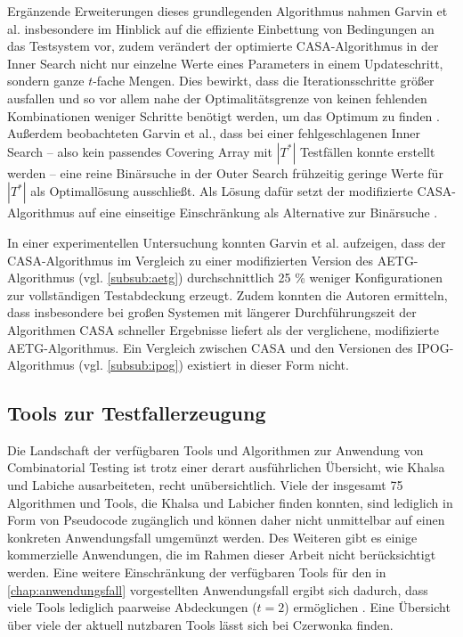 Ergänzende Erweiterungen dieses grundlegenden Algorithmus nahmen Garvin et al.\linebreak \cite{garvin2011evaluating} insbesondere im Hinblick auf die effiziente Einbettung von Bedingungen an das Testsystem vor, zudem verändert der optimierte CASA-Algorithmus in der \glqq Inner Search\grqq{} nicht nur einzelne Werte eines Parameters in einem Updateschritt, sondern ganze $t$-fache Mengen. Dies bewirkt, dass die Iterationsschritte größer ausfallen und so vor allem nahe der Optimalitätsgrenze von keinen fehlenden Kombinationen weniger Schritte benötigt werden, um das Optimum zu finden \cite{garvin2011evaluating}. Außerdem beobachteten Garvin et al., dass bei einer fehlgeschlagenen \glqq Inner Search\grqq{} -- also kein passendes Covering Array mit $|T^*|$ Testfällen konnte erstellt werden -- eine reine Binärsuche in der \glqq Outer Search\grqq{} frühzeitig geringe Werte für $|T^*|$ als Optimallösung ausschließt. Als Lösung dafür setzt der modifizierte CASA-Algorithmus auf eine einseitige Einschränkung als Alternative zur Binärsuche \cite{garvin2011evaluating}.

In einer experimentellen Untersuchung konnten Garvin et al. \cite{garvin2011evaluating} aufzeigen, dass der CASA-Algorithmus im Vergleich zu einer modifizierten Version des AETG-Algorithmus (vgl. \autoref{subsub:aetg}) durchschnittlich 25 \% weniger Konfigurationen zur vollständigen Testabdeckung erzeugt. Zudem konnten die Autoren ermitteln, dass insbesondere bei großen Systemen mit längerer Durchführungszeit der Algorithmen CASA schneller Ergebnisse liefert als der verglichene, modifizierte AETG-Algorithmus. Ein Vergleich zwischen CASA und den Versionen des IPOG-Algorithmus (vgl. \autoref{subsub:ipog}) existiert in dieser Form nicht.

\subsection{Tools zur Testfallerzeugung}

Die Landschaft der verfügbaren Tools und Algorithmen zur Anwendung von Combinatorial Testing ist trotz einer derart ausführlichen Übersicht, wie Khalsa und Labiche \cite{khalsa2014orchestrated} ausarbeiteten, recht unübersichtlich. Viele der insgesamt 75 Algorithmen und Tools, die Khalsa und Labicher finden konnten, sind lediglich in Form von Pseudocode zugänglich und können daher nicht unmittelbar auf einen konkreten Anwendungsfall umgemünzt werden. Des Weiteren gibt es einige kommerzielle Anwendungen, die im Rahmen dieser Arbeit nicht berücksichtigt werden. Eine weitere Einschränkung der verfügbaren Tools für den in \autoref{chap:anwendungsfall} vorgestellten Anwendungsfall ergibt sich dadurch, dass viele Tools lediglich paarweise Abdeckungen ($t=2$) ermöglichen \cite{khalsa2014orchestrated}. Eine Übersicht über viele der aktuell nutzbaren Tools lässt sich bei Czerwonka \cite{pairwisetesting} finden.

